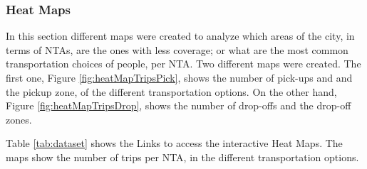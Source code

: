 \subsubsection{Heat Maps}
\label{secc:heatMaps}
In this section different maps were created to analyze which areas of the city, in terms of NTAs, are the ones with less coverage; or what are the most common transportation choices of people, per NTA. Two different maps were created. The first one, Figure \ref{fig:heatMapTripsPick}, shows the number of pick-ups and and the pickup zone, of the different transportation options. On the other hand, Figure \ref{fig:heatMapTripsDrop}, shows the number of drop-offs and the drop-off zones.

Table \ref{tab:dataset} shows the Links to access the interactive Heat Maps. The maps show the number of trips per NTA, in the different transportation options.

